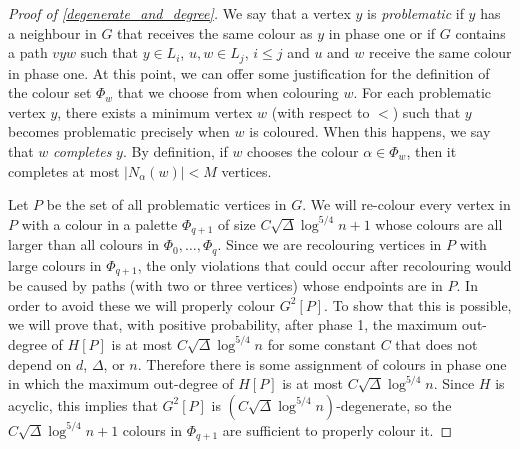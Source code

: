 \documentclass{patmorin}
\newcommand{\defin}[1]{\emph{\color{brightmaroon}#1}}
\begin{document}
\begin{proof}[Proof of \cref{degenerate_and_degree}]

  We say that a vertex $y$ is \defin{problematic} if $y$ has a neighbour in $G$ that receives the same colour as $y$ in phase one or if $G$ contains a path $vyw$ such that $y\in L_i$, $u,w\in L_j$, $i \le j$ and $u$ and $w$ receive the same colour in phase one.  At this point, we can offer some justification for the definition of the colour set $\Phi_w$ that we choose from when colouring $w$. For each problematic vertex $y$, there exists a minimum vertex $w$ (with respect to $<$) such that $y$ becomes problematic precisely when $w$ is coloured.  When this happens, we say that $w$ \defin{completes} $y$. By definition, if $w$ chooses the colour $\alpha\in\Phi_w$, then it completes at most $|N_{\alpha}(w)|<M$ vertices.



  Let $P$ be the set of all problematic vertices in $G$.  We will re-colour every vertex in $P$ with a colour in a palette $\Phi_{q+1}$ of size $C\sqrt{\Delta}\log^{5/4} n+1$ whose colours are all larger than all colours in $\Phi_0,\ldots,\Phi_q$.  Since we are recolouring vertices in $P$ with large colours in $\Phi_{q+1}$, the only violations that could occur after recolouring would be caused by paths (with two or three vertices) whose endpoints are in $P$.  In order to avoid these we will properly colour $G^2[P]$.  To show that this is possible, we will prove that, with positive probability, after phase 1, the maximum out-degree of $H[P]$ is at most $C\sqrt{\Delta}\log^{5/4} n$ for some constant $C$ that does not depend on $d$, $\Delta$, or $n$.  Therefore there is some assignment of colours in phase one in which the maximum out-degree of $H[P]$ is at most $C\sqrt{\Delta}\log^{5/4} n$.  Since $H$ is acyclic, this implies that $G^2[P]$ is $(C\sqrt{\Delta}\log^{5/4} n)$-degenerate, so the $C\sqrt{\Delta}\log^{5/4} n+1$ colours in $\Phi_{q+1}$ are sufficient to properly colour it.


\end{proof}
\end{document}
